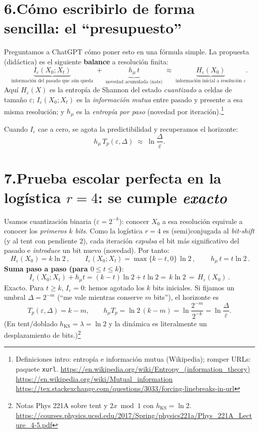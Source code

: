 \documentclass[11pt,a4paper]{article}
\begin{document}
\section*{6.\;Cómo escribirlo de forma sencilla: el ``presupuesto''}
Preguntamos a ChatGPT cómo poner esto en una fórmula simple. La propuesta (didáctica) es el siguiente \textbf{balance} a resolución finita:
\[
\underbrace{I_{\varepsilon}(X_0;X_t)}_{\text{información del pasado que aún queda}}
\;+\;
\underbrace{h_{\mu}\,t}_{\text{novedad acumulada (nats)}}
\;\approx\;
\underbrace{H_{\varepsilon}(X_0)}_{\text{información inicial a resolución }\varepsilon}.
\]
Aquí $H_{\varepsilon}(X)$ es la entropía de Shannon del estado \emph{cuantizado} a celdas de tamaño $\varepsilon$; $I_{\varepsilon}(X_0;X_t)$ es la \emph{información mutua} entre pasado y presente a esa misma resolución; y $h_\mu$ es la \emph{entropía por paso} (novedad por iteración).\footnote{Definiciones intro: entropía e información mutua (Wikipedia); romper URLs: paquete \texttt{xurl}. \url{https://en.wikipedia.org/wiki/Entropy_(information_theory)} \; \url{https://en.wikipedia.org/wiki/Mutual_information} \; \url{https://tex.stackexchange.com/questions/3033/forcing-linebreaks-in-url}}

Cuando $I_{\varepsilon}$ cae a cero, se agota la predictibilidad y recuperamos el horizonte:
\[
h_{\mu}\,T_p(\varepsilon,\Delta)\;\approx\;\ln\!\frac{\Delta}{\varepsilon}.
\]

\section*{7.\;Prueba escolar perfecta en la logística $r=4$: se cumple \emph{exacto}}
Usamos cuantización binaria ($\varepsilon=2^{-k}$): conocer $X_0$ a esa resolución equivale a conocer los \emph{primeros $k$ bits}. Como la logística $r=4$ es (semi)conjugada al \emph{bit-shift} (y al tent con pendiente $2$), cada iteración \emph{expulsa} el bit más significativo del pasado e \emph{introduce} un bit nuevo (novedad). Por tanto:
\[
\boxed{\,H_{\varepsilon}(X_0)=k\ln 2\,},\qquad
\boxed{\,I_{\varepsilon}(X_0;X_t)=\max\{k-t,0\}\,\ln 2\,},\qquad
\boxed{\,h_{\mu}\,t=t\ln 2\,}.
\]
\textbf{Suma paso a paso (para $0\le t\le k$)}:
\[
I_{\varepsilon}(X_0;X_t)+h_{\mu}t
=(k-t)\ln 2+t\ln 2
=\boxed{\,k\ln 2\,}
=\boxed{\,H_{\varepsilon}(X_0)\,}.
\]
Exacto. Para $t\ge k$, $I_{\varepsilon}=0$: hemos agotado los $k$ bits iniciales. Si fijamos un umbral $\Delta=2^{-m}$ (``me vale mientras conserve $m$ bits''), el horizonte es
\[
T_p(\varepsilon,\Delta)=k-m,\qquad
h_{\mu}T_p=\ln 2\,(k-m)=\ln\!\frac{2^{-m}}{2^{-k}}=\ln\!\frac{\Delta}{\varepsilon}.
\]
(En tent/doblado $h_{\mathrm{KS}}=\lambda=\ln 2$ y la dinámica es literalmente un desplazamiento de bits.)\footnote{Notas Phys 221A sobre tent y $2x\bmod 1$ con $h_{\mathrm{KS}}=\ln 2$. \url{https://courses.physics.ucsd.edu/2017/Spring/physics221a/Phys_221A_Lecture_4-5.pdf}}
\end{document}
